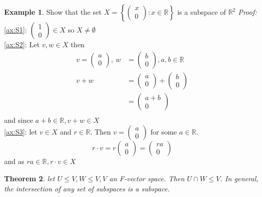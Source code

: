 \documentclass{report}
\newtheorem{theorem}{Theorem}[subsection]
\theoremstyle{remark}
\theoremstyle{definition}
\theoremstyle{definition}
\newtheorem{example}[theorem]{Example}
\theoremstyle{theorem}
\begin{document}
\begin{example}
Show that the set $X = \left\{ \begin{pmatrix} x\\0\end{pmatrix}: x \in \mathbb{R} \right\}$ is a subspace of $\mathbb{R}^2$
\emph{Proof:}\\\ref{ax:S1}: $ \begin{pmatrix} 1\\0\end{pmatrix} \in X$ so $X \neq \emptyset$ \\
\ref{ax:S2}: Let $v,w \in X$ then 
\begin{align*}v = \begin{pmatrix}a \\0\end{pmatrix}, \>w &= \begin{pmatrix}b\\0\end{pmatrix}, a,b \in \mathbb{R}\\
v + w &= \begin{pmatrix}a\\0\end{pmatrix} + \begin{pmatrix}b\\0\end{pmatrix}\\
&= \begin{pmatrix} a + b\\0 \end{pmatrix}\\
\end{align*}
and since $a + b \in \mathbb{R}, v + w \in X$\\
\ref{ax:S3}: let $v \in X$ and $r \in \mathbb{R}$. Then $v = \begin{pmatrix}a\\0\end{pmatrix}$ for some $a \in \mathbb{R}$.
\[ r \cdot v = r\begin{pmatrix}a\\0\end{pmatrix} = \begin{pmatrix}ra\\0\end{pmatrix} \]
and as $ra \in \mathbb{R}, r \cdot v \in X$
\end{example}
\begin{theorem}
let $U \leq V, W \leq V, V$ an F-vector space. Then $U \cap W \leq V$. In general, the intersection of any set of subspaces is a subspace.
\end{theorem}
\end{document}
